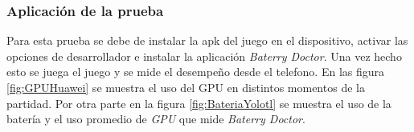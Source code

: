 \subsubsection{Aplicación de la prueba}
Para esta prueba se debe de instalar la apk del juego en el dispositivo, activar las 
opciones de desarrollador e instalar la aplicación \textit{Baterry Doctor}.  Una vez 
hecho esto se juega el juego y se mide el desempeño desde el telefono. En las figura 
\ref{fig:GPUHuawei} se muestra el uso del GPU en distintos momentos de la 
partidad. Por otra parte en la figura \ref{fig:BateriaYolotl} se muestra el uso 
de la batería y el uso promedio de \textit{GPU} que mide \textit{Baterry Doctor}.
\\
\par
\begin{figure}
  \centering
  
   
   
   
   

\end{figure}
